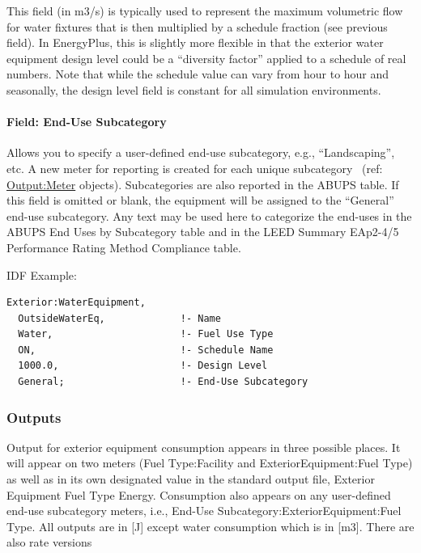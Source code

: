 This field (in m3/s) is typically used to represent the maximum volumetric flow for water fixtures that is then multiplied by a schedule fraction (see previous field). In EnergyPlus, this is slightly more flexible in that the exterior water equipment design level could be a ``diversity factor'' applied to a schedule of real numbers. Note that while the schedule value can vary from hour to hour and seasonally, the design level field is constant for all simulation environments.

\paragraph{Field: End-Use Subcategory}\label{field-end-use-subcategory-2}

Allows you to specify a user-defined end-use subcategory, e.g., ``Landscaping'', etc. A new meter for reporting is created for each unique subcategory~ (ref: \hyperref[outputmeter-and-outputmetermeterfileonly]{Output:Meter} objects). Subcategories are also reported in the ABUPS table. If this field is omitted or blank, the equipment will be assigned to the ``General'' end-use subcategory. Any text may be used here to categorize the end-uses in the ABUPS End Uses by Subcategory table and in the LEED Summary EAp2-4/5 Performance Rating Method Compliance table.

IDF Example:

\begin{lstlisting}
Exterior:WaterEquipment,
  OutsideWaterEq,             !- Name
  Water,                      !- Fuel Use Type
  ON,                         !- Schedule Name
  1000.0,                     !- Design Level
  General;                    !- End-Use Subcategory
\end{lstlisting}


\subsubsection{Outputs}\label{outputs-1-010}

Output for exterior equipment consumption appears in three possible places. It will appear on two meters (Fuel Type:Facility and ExteriorEquipment:Fuel Type) as well as in its own designated value in the standard output file, Exterior Equipment Fuel Type Energy. Consumption also appears on any user-defined end-use subcategory meters, i.e., End-Use Subcategory:ExteriorEquipment:Fuel Type. All outputs are in {[}J{]} except water consumption which is in {[}m3{]}. There are also rate versions

